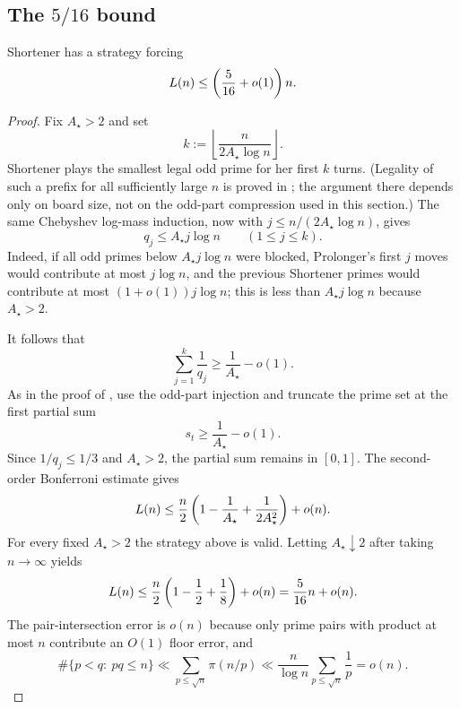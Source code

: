\subsection{The \texorpdfstring{$5/16$}{5/16} bound}

\begin{theorem}\label{thm:five-sixteen}
Shortener has a strategy forcing
\[
  L(n)\le\left(\frac{5}{16}+o(1)\right)n.
\]
\end{theorem}

\begin{proof}
Fix $A_\star>2$ and set
\[
  k:=\left\lfloor\frac{n}{2A_\star\log n}\right\rfloor.
\]
Shortener plays the smallest legal odd prime for her first $k$ turns.
(Legality of such a prefix for all sufficiently large $n$ is proved in
; the argument there depends only on board size, not
on the odd-part compression used in this section.)  The
same Chebyshev log-mass induction, now with $j\le n/(2A_\star\log n)$, gives
\[
  q_j\le A_\star j\log n
  \qquad (1\le j\le k).
\]
Indeed, if all odd primes below $A_\star j\log n$ were blocked, Prolonger's first
$j$ moves would contribute at most $j\log n$, and the previous Shortener primes
would contribute at most $(1+o(1))j\log n$; this is less than
$A_\star j\log n$ because $A_\star>2$.

It follows that
\[
  \sum_{j=1}^k\frac1{q_j}\ge \frac1{A_\star}-o(1).
\]
As in the proof of , use the odd-part injection and
truncate the prime set at the first partial sum
\[
  s_t\ge \frac1{A_\star}-o(1).
\]
Since $1/q_j\le1/3$ and $A_\star>2$, the partial sum remains in $[0,1]$.  The
second-order Bonferroni estimate gives
\[
  L(n)
  \le
  \frac n2
  \left(1-\frac1{A_\star}+\frac{1}{2A_\star^2}\right)
  +o(n).
\]
For every fixed $A_\star>2$ the strategy above is valid.  Letting
$A_\star\downarrow2$ after taking $n\to\infty$ yields
\[
  L(n)\le \frac n2\left(1-\frac12+\frac18\right)+o(n)
  =
  \frac{5}{16}n+o(n).
\]
The pair-intersection error is $o(n)$ because only prime pairs with product at
most $n$ contribute an $O(1)$ floor error, and
\[
  \#\{p<q:\ pq\le n\}
  \ll \sum_{p\le\sqrt n}\pi(n/p)
  \ll \frac{n}{\log n}\sum_{p\le\sqrt n}\frac1p
  =
  o(n).
\]
\end{proof}
